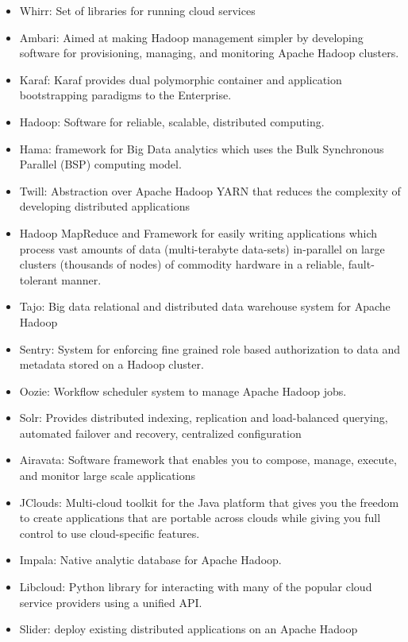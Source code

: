 \documentclass[natbib]{svjour3}
\providecommand{\tightlist}{%
  \setlength{\itemsep}{0pt}\setlength{\parskip}{0pt}}
\begin{document}
\begin{itemize}
\tightlist
\item
  Whirr: Set of libraries for running cloud services
\item
  Ambari: Aimed at making Hadoop management simpler by developing
  software for provisioning, managing, and monitoring Apache Hadoop
  clusters.
\item
  Karaf: Karaf provides dual polymorphic container and application
  bootstrapping paradigms to the Enterprise.
\item
  Hadoop: Software for reliable, scalable, distributed computing.
\item
  Hama: framework for Big Data analytics which uses the Bulk Synchronous
  Parallel (BSP) computing model.
\item
  Twill: Abstraction over Apache Hadoop YARN that reduces the complexity
  of developing distributed applications
\item
  Hadoop MapReduce and Framework for easily writing applications which
  process vast amounts of data (multi-terabyte data-sets) in-parallel on
  large clusters (thousands of nodes) of commodity hardware in a
  reliable, fault-tolerant manner.
\item
  Tajo: Big data relational and distributed data warehouse system for
  Apache Hadoop
\item
  Sentry: System for enforcing fine grained role based authorization to
  data and metadata stored on a Hadoop cluster.
\item
  Oozie: Workflow scheduler system to manage Apache Hadoop jobs.
\item
  Solr: Provides distributed indexing, replication and load-balanced
  querying, automated failover and recovery, centralized configuration
\item
  Airavata: Software framework that enables you to compose, manage,
  execute, and monitor large scale applications
\item
  JClouds: Multi-cloud toolkit for the Java platform that gives you the
  freedom to create applications that are portable across clouds while
  giving you full control to use cloud-specific features.
\item
  Impala: Native analytic database for Apache Hadoop.
\item
  Libcloud: Python library for interacting with many of the popular
  cloud service providers using a unified API.
\item
  Slider: deploy existing distributed applications on an Apache Hadoop

\end{itemize}
\end{document}
